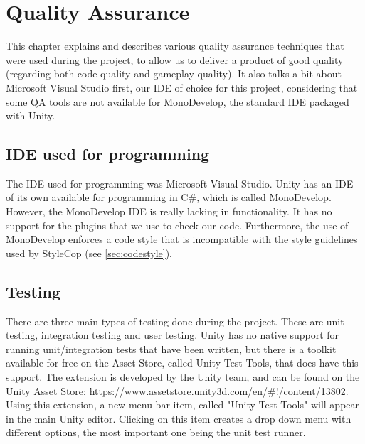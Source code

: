 \chapter{Quality Assurance} \label{cha:qa}
	This chapter explains and describes various quality assurance techniques 
	that were used during the project, to allow us to deliver a product of 
	good quality (regarding both code quality and gameplay quality). It also
	talks a bit about Microsoft Visual Studio first, our IDE of choice for
	this project, considering that some QA tools are not available for
	MonoDevelop, the standard IDE packaged with Unity.
	
	\section{IDE used for programming} \label{sec:ide}
		The IDE used for programming was Microsoft Visual Studio. Unity has an IDE
		of its own available for programming in C\#, which is called MonoDevelop.
		However, the MonoDevelop IDE is really lacking in functionality. It has no
		support for the plugins that we use to check our code. Furthermore, the use
		of MonoDevelop enforces a code style that is incompatible with the style 
		guidelines used by StyleCop (see \ref{sec:codestyle}), 
	
	\section{Testing} \label{sec:testing}
		There are three main types of testing done during the project. These are
		unit testing, integration testing and user testing. Unity has no native
		support for running unit\slash integration tests that have been written,
		but there is a toolkit available for free on the Asset Store, called
		Unity Test Tools,  that does have this support. The extension is
		developed by the Unity team, and can be found on the Unity Asset Store: 
		\url{https://www.assetstore.unity3d.com/en/#!/content/13802}.
		Using this extension, a new menu bar item, called "Unity Test Tools"
		will appear in the main Unity editor. Clicking on this item creates a drop
		down menu with different options, the most important one being the unit test
		runner.
		
